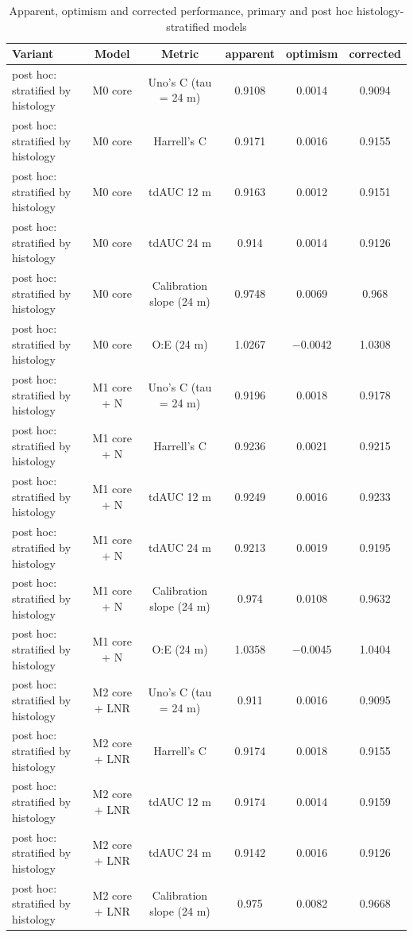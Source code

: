 \begin{table}[htbp]
\caption{Apparent, optimism and corrected performance, primary and post hoc histology-stratified models}\label{tab:s8_prognostic_performance_all}
\scriptsize
\begin{tabular*}{\textwidth}{@{\extracolsep{\fill}}lccccc@{}}
\toprule
Variant & Model & Metric & apparent & optimism & corrected \\
\midrule
post hoc: stratified by histology & M0 core & Uno's C (tau = 24 m) & 0.9108 & 0.0014 & 0.9094 \\
post hoc: stratified by histology & M0 core & Harrell's C & 0.9171 & 0.0016 & 0.9155 \\
post hoc: stratified by histology & M0 core & tdAUC 12 m & 0.9163 & 0.0012 & 0.9151 \\
post hoc: stratified by histology & M0 core & tdAUC 24 m & 0.914 & 0.0014 & 0.9126 \\
post hoc: stratified by histology & M0 core & Calibration slope (24 m) & 0.9748 & 0.0069 & 0.968 \\
post hoc: stratified by histology & M0 core & O:E (24 m) & 1.0267 & $-$0.0042 & 1.0308 \\
post hoc: stratified by histology & M1 core + N & Uno's C (tau = 24 m) & 0.9196 & 0.0018 & 0.9178 \\
post hoc: stratified by histology & M1 core + N & Harrell's C & 0.9236 & 0.0021 & 0.9215 \\
post hoc: stratified by histology & M1 core + N & tdAUC 12 m & 0.9249 & 0.0016 & 0.9233 \\
post hoc: stratified by histology & M1 core + N & tdAUC 24 m & 0.9213 & 0.0019 & 0.9195 \\
post hoc: stratified by histology & M1 core + N & Calibration slope (24 m) & 0.974 & 0.0108 & 0.9632 \\
post hoc: stratified by histology & M1 core + N & O:E (24 m) & 1.0358 & $-$0.0045 & 1.0404 \\
post hoc: stratified by histology & M2 core + LNR & Uno's C (tau = 24 m) & 0.911 & 0.0016 & 0.9095 \\
post hoc: stratified by histology & M2 core + LNR & Harrell's C & 0.9174 & 0.0018 & 0.9155 \\
post hoc: stratified by histology & M2 core + LNR & tdAUC 12 m & 0.9174 & 0.0014 & 0.9159 \\
post hoc: stratified by histology & M2 core + LNR & tdAUC 24 m & 0.9142 & 0.0016 & 0.9126 \\
post hoc: stratified by histology & M2 core + LNR & Calibration slope (24 m) & 0.975 & 0.0082 & 0.9668 \\

\end{tabular*}
\end{table}
